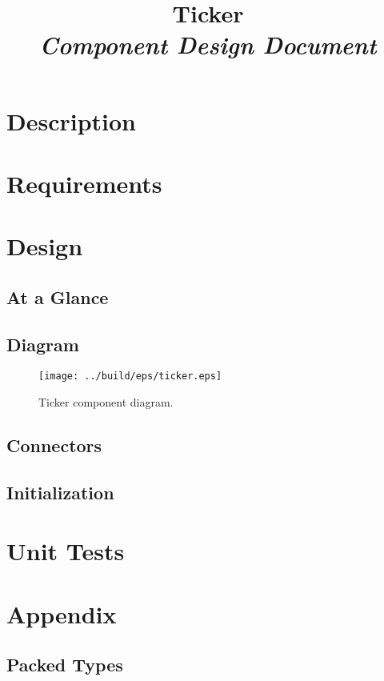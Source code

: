 



\title{\textbf{Ticker} \\
\large\textit{Component Design Document}}
\date{}
\maketitle

\section{Description}


\section{Requirements}


\section{Design}

\subsection{At a Glance}


\subsection{Diagram}
\begin{figure}[H]
  \texttt{[image: ../build/eps/ticker.eps]}
  \caption{Ticker component diagram.}
\end{figure}

\subsection{Connectors}


\subsection{Initialization}


\section{Unit Tests}



\section{Appendix}
\subsection{Packed Types}




